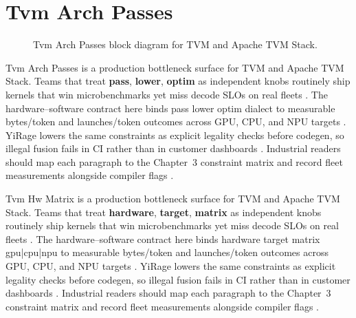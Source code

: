 \section{Tvm Arch Passes}
\label{sec:tvm_arch_passes}
\begin{figure}[t]
\centering
{}
\caption{Tvm Arch Passes block diagram for TVM and Apache TVM Stack.}
\label{fig:tvm_arch_passes_architecture}
\end{figure}


Tvm Arch Passes is a production bottleneck surface for TVM and Apache TVM Stack. Teams that treat \textbf{pass}, \textbf{lower}, \textbf{optim} as independent knobs routinely ship kernels that win microbenchmarks yet miss decode SLOs on real fleets \citep{taxbreak2026,semianalysis2024tma}. The hardware--software contract here binds pass lower optim dialect to measurable bytes/token and launches/token outcomes across GPU, CPU, and NPU targets \citep{memoryfloor2026,amd2024xdna}. YiRage lowers the same constraints as explicit legality checks before codegen, so illegal fusion fails in CI rather than in customer dashboards \citep{nvidia2022hopper,amd2024aie}. Industrial readers should map each paragraph to the Chapter~3 constraint matrix and record fleet measurements alongside compiler flags \citep{semianalysis2024tma,dlbook}.

Tvm Hw Matrix is a production bottleneck surface for TVM and Apache TVM Stack. Teams that treat \textbf{hardware}, \textbf{target}, \textbf{matrix} as independent knobs routinely ship kernels that win microbenchmarks yet miss decode SLOs on real fleets \citep{liu2024deepseekv3,memoryfloor2026}. The hardware--software contract here binds hardware target matrix gpu|cpu|npu to measurable bytes/token and launches/token outcomes across GPU, CPU, and NPU targets \citep{patel2025llminference,nvidia2022hopper}. YiRage lowers the same constraints as explicit legality checks before codegen, so illegal fusion fails in CI rather than in customer dashboards \citep{taxbreak2026,semianalysis2024tma}. Industrial readers should map each paragraph to the Chapter~3 constraint matrix and record fleet measurements alongside compiler flags \citep{memoryfloor2026,amd2024xdna}.

